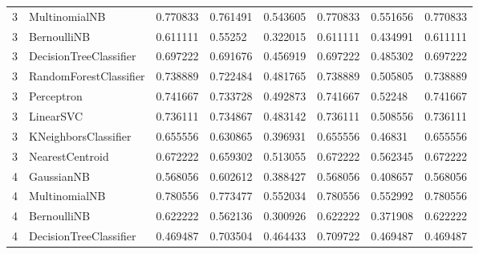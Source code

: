 \documentclass{article}
\begin{document}
\begin{table}[h]
\begin{tabular}{llllllll}
3             & MultinomialNB          & 0.770833          & 0.761491          & 0.543605              & 0.770833              & 0.551656                 & 0.770833                 \\
3             & BernoulliNB            & 0.611111          & 0.55252           & 0.322015              & 0.611111              & 0.434991                 & 0.611111                 \\
3             & DecisionTreeClassifier & 0.697222          & 0.691676          & 0.456919              & 0.697222              & 0.485302                 & 0.697222                 \\
3             & RandomForestClassifier & 0.738889          & 0.722484          & 0.481765              & 0.738889              & 0.505805                 & 0.738889                 \\
3             & Perceptron             & 0.741667          & 0.733728          & 0.492873              & 0.741667              & 0.52248                  & 0.741667                 \\
3             & LinearSVC              & 0.736111          & 0.734867          & 0.483142              & 0.736111              & 0.508556                 & 0.736111                 \\
3             & KNeighborsClassifier   & 0.655556          & 0.630865          & 0.396931              & 0.655556              & 0.46831                  & 0.655556                 \\
3             & NearestCentroid        & 0.672222          & 0.659302          & 0.513055              & 0.672222              & 0.562345                 & 0.672222                 \\
4             & GaussianNB             & 0.568056          & 0.602612          & 0.388427              & 0.568056              & 0.408657                 & 0.568056                 \\
4             & MultinomialNB          & 0.780556          & 0.773477          & 0.552034              & 0.780556              & 0.552992                 & 0.780556                 \\
4             & BernoulliNB            & 0.622222          & 0.562136          & 0.300926              & 0.622222              & 0.371908                 & 0.622222                 \\
4             & DecisionTreeClassifier & 0.469487          & 0.703504          & 0.464433              & 0.709722              & 0.469487                 & 0.469487                 \\

\end{tabular}
\end{table}
\end{document}
